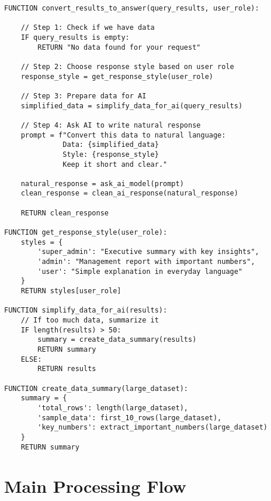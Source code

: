 \begin{verbatim}
FUNCTION convert_results_to_answer(query_results, user_role):
    
    // Step 1: Check if we have data
    IF query_results is empty:
        RETURN "No data found for your request"
    
    // Step 2: Choose response style based on user role
    response_style = get_response_style(user_role)
    
    // Step 3: Prepare data for AI
    simplified_data = simplify_data_for_ai(query_results)
    
    // Step 4: Ask AI to write natural response
    prompt = f"Convert this data to natural language:
              Data: {simplified_data}
              Style: {response_style}
              Keep it short and clear."
    
    natural_response = ask_ai_model(prompt)
    clean_response = clean_ai_response(natural_response)
    
    RETURN clean_response

FUNCTION get_response_style(user_role):
    styles = {
        'super_admin': "Executive summary with key insights",
        'admin': "Management report with important numbers", 
        'user': "Simple explanation in everyday language"
    }
    RETURN styles[user_role]

FUNCTION simplify_data_for_ai(results):
    // If too much data, summarize it
    IF length(results) > 50:
        summary = create_data_summary(results)
        RETURN summary
    ELSE:
        RETURN results

FUNCTION create_data_summary(large_dataset):
    summary = {
        'total_rows': length(large_dataset),
        'sample_data': first_10_rows(large_dataset),
        'key_numbers': extract_important_numbers(large_dataset)
    }
    RETURN summary
\end{verbatim}

\section*{Main Processing Flow}

